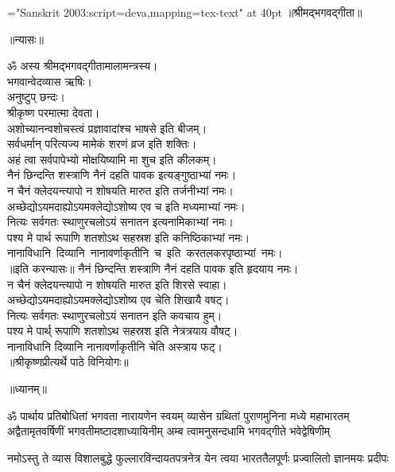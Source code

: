 \centerline{\font\x="Sanskrit 2003:script=deva,mapping=tex-text" at 40pt \x ॥श्रीमद्भगवद्गीता॥}
\bigskip
\centerline{\Large ॥न्यासः॥}
\medskip
{}
ॐ अस्य श्रीमद्‌भगवद्‌गीतामालामन्त्रस्य।\\ 
भगवान्वेदव्यास ऋषिः।\\
अनुष्टुप्‌ छन्दः।\\
श्रीकृष्ण परमात्मा देवता।\\
अशोच्यानन्वशोचस्त्वं प्रज्ञावादांश्च भाषसे इति बीजम्‌।\\
सर्वधर्मान्‌ परित्यज्य मामेकं शरणं व्रज इति शक्तिः।\\
अहं त्वा सर्वपापेभ्यो मोक्षयिष्यामि मा शुच इति कीलकम्‌।\\
नैनं छिन्दन्ति शस्त्राणि नैनं दहति पावक इत्यङ्गुष्ठाभ्यां नमः।\\
न चैनं क्लेदयन्त्यापो न शोषयति मारुत इति तर्जनीभ्यां नमः।\\
अच्छेद्योऽयमदाह्योऽयमक्लेद्योऽशोष्य एव च इति मध्यमाभ्यां नमः।\\
नित्यः सर्वगतः स्थाणुरचलोऽयं सनातन इत्यनामिकाभ्यां नमः।\\
पश्य मे पार्थ रूपाणि शतशोऽथ सहस्रश इति कनिष्ठिकाभ्यां नमः।\\
नानाविधानि~दिव्यानि~नानावर्णाकृतीनि~च~इति~करतलकरपृष्ठाभ्यां~नमः।\\
{॥इति करन्यासः॥}
\medskip
\newpage
{}
नैनं छिन्दन्ति शस्त्राणि नैनं दहति पावक इति हृदयाय नमः।\\
न चैनं क्लेदयन्त्यापो न शोषयति मारुत इति शिरसे स्वाहा।\\
अच्छेद्योऽयमदाह्योऽयमक्लेद्योऽशोष्य एव चेति शिखायै वषट्‌।\\
नित्यः सर्वगतः स्थाणुरचलोऽयं सनातन इति कवचाय हुम्‌।\\
पश्य मे पार्थ् रूपाणि शतशोऽथ सहस्रश इति नेत्रत्रयाय वौषट्‌।\\
नानाविधानि दिव्यानि नानावर्णाकृतीनि चेति अस्त्राय फट्‌।\\
{॥श्रीकृष्णप्रीत्यर्थे पाठे विनियोगः॥}
\vfill
\centerline{\Large ॥ध्यानम्॥}
\fourlineindentedshloka
{ॐ पार्थाय प्रतिबोधितां भगवता नारायणेन स्वयम्}
{व्यासेन ग्रथितां पुराणमुनिना मध्ये महाभारतम्}
{अद्वैतामृतवर्षिणीं भगवतीमष्टादशाध्यायिनीम्}
{अम्ब त्वामनुसन्दधामि भगवद्गीते भवेद्वेषिणीम्}%

\twolineshloka
{नमोऽस्तु ते व्यास विशालबुद्धे फुल्लारविन्दायतपत्रनेत्र}
{येन त्वया भारततैलपूर्णः प्रज्वालितो ज्ञानमयः प्रदीपः}%

